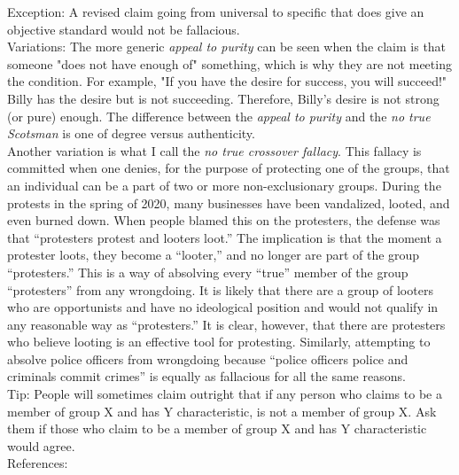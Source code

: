 \documentclass[a4paper,12pt,single,pdftex]{scrbook}
\begin{document}
    
      Exception: A revised claim going from universal to specific that does give an objective standard would not be fallacious.
    \\

    
      Variations: The more generic {\it appeal to purity} can be seen when the claim is that someone "does not have enough of" something, which is why they are not meeting the condition. For example, "If you have the desire for success, you will succeed!" Billy has the desire but is not succeeding. Therefore, Billy's desire is not strong (or pure) enough. The difference between the {\it appeal to purity} and the {\it no true Scotsman} is one of degree versus authenticity.
    \\

    
      Another variation is what I call the {\em no true crossover fallacy}. This fallacy is committed when one denies, for the purpose of protecting one of the groups, that an individual can be a part of two or more non-exclusionary groups. During the protests in the spring of 2020, many businesses have been vandalized, looted, and even burned down. When people blamed this on the protesters, the defense was that “protesters protest and looters loot.” The implication is that the moment a protester loots, they become a “looter,” and no longer are part of the group “protesters.” This is a way of absolving every “true” member of the group “protesters” from any wrongdoing. It is likely that there are a group of looters who are opportunists and have no ideological position and would not qualify in any reasonable way as “protesters.” It is clear, however, that there are protesters who believe looting is an effective tool for protesting. Similarly, attempting to absolve police officers from wrongdoing because “police officers police and criminals commit crimes” is equally as fallacious for all the same reasons.
    \\

    
      Tip: People will sometimes claim outright that if any person who claims to be a member of group X and has Y characteristic, is not a member of group X. Ask them if those who claim to be a member of group X and has Y characteristic would agree.
    \\

    References:

    
      
        
      \\

      
        
\end{document}
